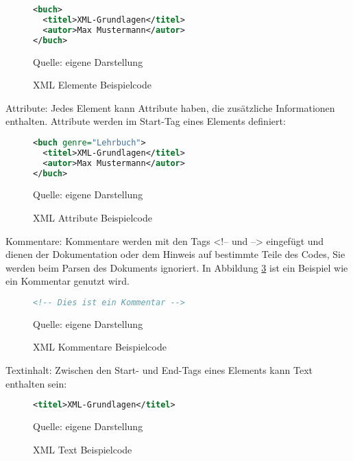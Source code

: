 \begin{figure}[H]
\centering
\begin{minipage}{0.95\textwidth}
\begin{lstlisting}[language=XML]
<buch>
  <titel>XML-Grundlagen</titel>
  <autor>Max Mustermann</autor>
</buch>
\end{lstlisting}
\end{minipage}
\caption{XML Elemente Beispielcode}
\label{fig:XML Elemente Beispielcode}
    {Quelle: eigene Darstellung}
\end{figure}

Attribute: Jedes Element kann Attribute haben, die zusätzliche Informationen enthalten.
Attribute werden im Start-Tag eines Elements definiert:

\begin{figure}[H]
\centering
\begin{minipage}{0.95\textwidth}
\begin{lstlisting}[language=XML]
<buch genre="Lehrbuch">
  <titel>XML-Grundlagen</titel>
  <autor>Max Mustermann</autor>
</buch>
\end{lstlisting}
\end{minipage}
\caption{XML Attribute Beispielcode}
\label{fig:XML Attribute Beispielcode}
    {Quelle: eigene Darstellung}
\end{figure}

Kommentare: Kommentare werden mit den Tags <!-- und --> eingefügt und dienen der Dokumentation oder dem Hinweis auf bestimmte Teile des Codes,
Sie werden beim Parsen des Dokuments ignoriert. In Abbildung \ref{fig:XML Kommentare Beispielcode} ist ein Beispiel wie
ein Kommentar genutzt wird.

\begin{figure}[H]
\centering
\begin{minipage}{0.95\textwidth}
\begin{lstlisting}[language=XML]
<!-- Dies ist ein Kommentar -->
\end{lstlisting}
\end{minipage}
\caption{XML Kommentare Beispielcode}
\label{fig:XML Kommentare Beispielcode}
    {Quelle: eigene Darstellung}
\end{figure}

Textinhalt: Zwischen den Start- und End-Tags eines Elements kann Text enthalten sein:

\begin{figure}[H]
\centering
\begin{minipage}{0.95\textwidth}
\begin{lstlisting}[language=XML]
<titel>XML-Grundlagen</titel>
\end{lstlisting}
\end{minipage}
\caption{XML Text Beispielcode}
\label{fig:XML Text Beispielcode}
    {Quelle: eigene Darstellung}
\end{figure}

